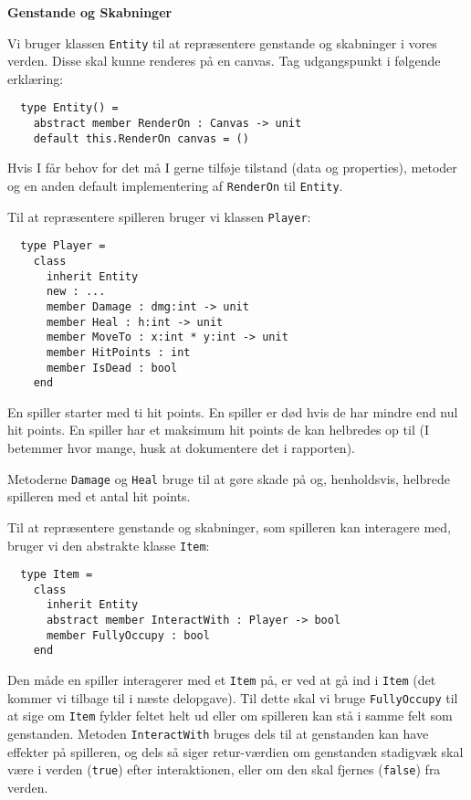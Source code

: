 \textbf{Genstande og Skabninger}

Vi bruger klassen \lstinline{Entity} til at repræsentere genstande og skabninger
i vores verden. Disse skal kunne renderes på en canvas. Tag udgangspunkt i
følgende erklæring:

\begin{lstlisting}
  type Entity() =
    abstract member RenderOn : Canvas -> unit
    default this.RenderOn canvas = ()
\end{lstlisting}

Hvis I får behov for det må I gerne tilføje tilstand (data og
properties), metoder og en anden default implementering af
\lstinline{RenderOn} til \lstinline{Entity}.

Til at repræsentere spilleren bruger vi klassen \lstinline{Player}:

\begin{lstlisting}
  type Player =
    class
      inherit Entity
      new : ...
      member Damage : dmg:int -> unit
      member Heal : h:int -> unit
      member MoveTo : x:int * y:int -> unit
      member HitPoints : int
      member IsDead : bool
    end
\end{lstlisting}

En spiller starter med ti hit points. En
spiller er død hvis de har mindre end nul hit points. En spiller
har et maksimum hit points de kan helbredes op til (I betemmer
hvor mange, husk at dokumentere det i rapporten).

Metoderne \lstinline{Damage} og \lstinline{Heal} bruge til at gøre
skade på og, henholdsvis, helbrede spilleren med et antal hit points.

Til at repræsentere genstande og skabninger, som spilleren kan
interagere med, bruger vi den abstrakte klasse \lstinline{Item}:

\begin{lstlisting}
  type Item =
    class
      inherit Entity
      abstract member InteractWith : Player -> bool
      member FullyOccupy : bool
    end
\end{lstlisting}

Den måde en spiller interagerer med et \lstinline{Item} på, er ved at
gå ind i \lstinline{Item} (det kommer vi tilbage til i næste
delopgave). Til dette skal vi bruge \lstinline{FullyOccupy} til at
sige om \lstinline{Item} fylder feltet helt ud eller om spilleren kan
stå i samme felt som genstanden. Metoden \lstinline{InteractWith}
bruges dels til at genstanden kan have effekter på spilleren, og dels
så siger retur-værdien om genstanden stadigvæk skal være i verden
(\lstinline{true}) efter interaktionen, eller om den skal fjernes
(\lstinline{false}) fra verden.

